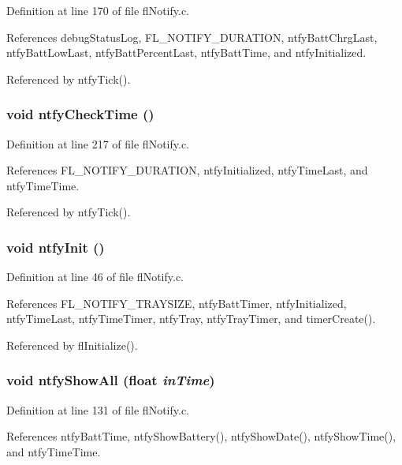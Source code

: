 Definition at line 170 of file fl\-Notify.c.

References debug\-Status\-Log, FL\_\-NOTIFY\_\-DURATION, ntfy\-Batt\-Chrg\-Last, ntfy\-Batt\-Low\-Last, ntfy\-Batt\-Percent\-Last, ntfy\-Batt\-Time, and ntfy\-Initialized.

Referenced by ntfy\-Tick().
\subsubsection{\setlength{\rightskip}{0pt plus 5cm}void ntfy\-Check\-Time ()}\label{flNotify_8h_a63e049aa2dbb4902b6f0d3363e5a8b7}




Definition at line 217 of file fl\-Notify.c.

References FL\_\-NOTIFY\_\-DURATION, ntfy\-Initialized, ntfy\-Time\-Last, and ntfy\-Time\-Time.

Referenced by ntfy\-Tick().
\subsubsection{\setlength{\rightskip}{0pt plus 5cm}void ntfy\-Init ()}\label{flNotify_8h_7c77f61ed638b2fc959277c5cf301a0a}




Definition at line 46 of file fl\-Notify.c.

References FL\_\-NOTIFY\_\-TRAYSIZE, ntfy\-Batt\-Timer, ntfy\-Initialized, ntfy\-Time\-Last, ntfy\-Time\-Timer, ntfy\-Tray, ntfy\-Tray\-Timer, and timer\-Create().

Referenced by fl\-Initialize().
\subsubsection{\setlength{\rightskip}{0pt plus 5cm}void ntfy\-Show\-All (float {\em in\-Time})}\label{flNotify_8h_7a3d59ce781288cef7644451105d6715}




Definition at line 131 of file fl\-Notify.c.

References ntfy\-Batt\-Time, ntfy\-Show\-Battery(), ntfy\-Show\-Date(), ntfy\-Show\-Time(), and ntfy\-Time\-Time.
